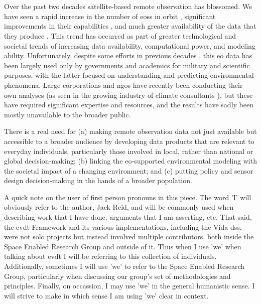 \chapter{}
Over the past two decades satellite-based remote observation has blossomed. We have seen a rapid increase in the number of \acp{eos} in orbit \cite{belwardWhoLaunchedWhat2015}, significant improvements in their capabilities \cite{jensenRemoteSensingEnvironment2006}, and much greater availability of the data that they produce \cite{borowitzOpenSpaceGlobal2017}. This trend has occurred as part of greater technological and societal trends of increasing data availability, computational power, and modeling ability. Unfortunately, despite some efforts in previous decades \cite{lightWarfareWelfareDefense2005}, this \ac{eo} data has been largely used only by governments and academics for military and scientific purposes, with the latter focused on understanding and predicting environmental phenomena. Large corporations and \acp{ngo} have recently been conducting their own analyses (as seen in the growing industry of climate consultants \cite{cohenTop10Climate2011}), but these have required significant expertise and resources, and the results have sadly been mostly unavailable to the broader public. 

There is a real need for (a) making remote observation data not just available but accessible to a broader audience by developing data products that are relevant to everyday individuals, particularly those involved in local, rather than national or global decision-making; (b) linking the \ac{eo}-supported environmental modeling with the societal impact of a changing environment; and (c) putting policy and sensor design decision-making in the hands of a broader population. 

A quick note on the user of first person pronouns in this piece. The word 'I' will obviously refer to the author, Jack Reid, and will be commonly used when describing work that I have done, arguments that I am asserting, etc. That said, the \ac{evdt} Framework and its various implementations, including the Vida \ac{dss}, were not solo projects but instead involved multiple contributors, both inside the Space Enabled Research Group and outside of it. Thus when I use 'we' when talking about \ac{evdt} I will be referring to this collection of individuals. Additionally, sometimes I will use 'we' to refer to the Space Enabled Research Group, particularly when discussing our group's set of methodologies and principles. Finally, on occassion, I may use 'we' in the general humanistic sense. I will strive to make in which sense I am using 'we' clear in context.


